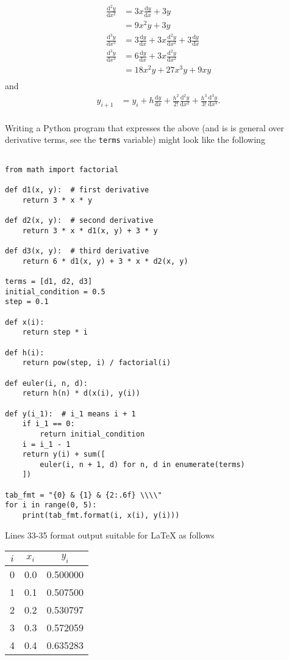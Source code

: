 \documentclass[10pt]{article}
\newcommand*{\dydx}[0]{\frac{\text{d}y}{\text{d}x}}
\newcommand*{\df}[2]{\frac{\text{d}{#1}}{\text{d}{#2}}}%
\begin{document}
\begin{enumerate}
\begin{align*}
                    \df{^2y}{x^2} &= 3x\dydx + 3y \\
                         &= 9x^2y + 3y \\
                    \df{^3y}{x^3} &= 3\dydx + 3x\df{^2y}{x^2} + 3\dydx \\
                    \df{^3y}{x^3} &= 6\dydx + 3x\df{^2y}{x^2} \\
                    &= 18x^2y + 27x^3y + 9xy\\
                \end{align*}
                and
                \begin{align*}
                    y_{i+1} &= y_i + h\dydx + \frac{h^2}{2!}\df{^2y}{x^2} + \frac{h^3}{3!}\df{^3y}{x^3}. \\
                \end{align*}

                \pagebreak

                Writing a Python program that expresses the above (and is is
                general over derivative terms, see the \texttt{terms}
                variable) might look like the following
                \begin{verbatim}
                
from math import factorial

def d1(x, y):  # first derivative
    return 3 * x * y

def d2(x, y):  # second derivative
    return 3 * x * d1(x, y) + 3 * y

def d3(x, y):  # third derivative
    return 6 * d1(x, y) + 3 * x * d2(x, y)

terms = [d1, d2, d3]
initial_condition = 0.5
step = 0.1

def x(i):
    return step * i

def h(i):
    return pow(step, i) / factorial(i)

def euler(i, n, d):
    return h(n) * d(x(i), y(i))

def y(i_1):  # i_1 means i + 1
    if i_1 == 0:
        return initial_condition
    i = i_1 - 1
    return y(i) + sum([
        euler(i, n + 1, d) for n, d in enumerate(terms)
    ])

tab_fmt = "{0} & {1} & {2:.6f} \\\\"
for i in range(0, 5):
    print(tab_fmt.format(i, x(i), y(i)))

                \end{verbatim}
    Lines 33-35 format output suitable for {\LaTeX} as follows

    \begin{tabular}{| c | c | c |}
        \hline
        $i$ & $x_i$ & $y_i$ \\
        \hline
        0 & 0.0 & 0.500000 \\
        1 & 0.1 & 0.507500 \\
        2 & 0.2 & 0.530797 \\
        3 & 0.3 & 0.572059 \\
        4 & 0.4 & 0.635283 \\
        \hline
    \end{tabular}
    \end{enumerate}
\end{document}

